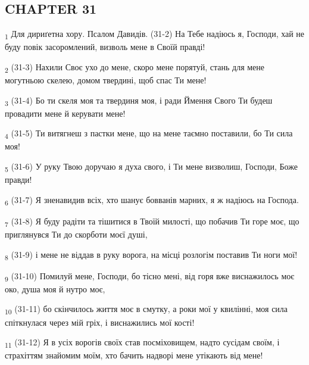 \subsection{CHAPTER 31}
\begin{tcolorbox}
\textsubscript{1} Для дириґетна хору. Псалом Давидів. (31-2) На Тебе надіюсь я, Господи, хай не буду повік засоромлений, визволь мене в Своїй правді!
\end{tcolorbox}
\begin{tcolorbox}
\textsubscript{2} (31-3) Нахили Своє ухо до мене, скоро мене порятуй, стань для мене могутньою скелею, домом твердині, щоб спас Ти мене!
\end{tcolorbox}
\begin{tcolorbox}
\textsubscript{3} (31-4) Бо ти скеля моя та твердиня моя, і ради Ймення Свого Ти будеш провадити мене й керувати мене!
\end{tcolorbox}
\begin{tcolorbox}
\textsubscript{4} (31-5) Ти витягнеш з пастки мене, що на мене таємно поставили, бо Ти сила моя!
\end{tcolorbox}
\begin{tcolorbox}
\textsubscript{5} (31-6) У руку Твою доручаю я духа свого, і Ти мене визволиш, Господи, Боже правди!
\end{tcolorbox}
\begin{tcolorbox}
\textsubscript{6} (31-7) Я зненавидив всіх, хто шанує бовванів марних, я ж надіюсь на Господа.
\end{tcolorbox}
\begin{tcolorbox}
\textsubscript{7} (31-8) Я буду радіти та тішитися в Твоїй милості, що побачив Ти горе моє, що приглянувся Ти до скорботи моєї душі,
\end{tcolorbox}
\begin{tcolorbox}
\textsubscript{8} (31-9) і мене не віддав в руку ворога, на місці розлогім поставив Ти ноги мої!
\end{tcolorbox}
\begin{tcolorbox}
\textsubscript{9} (31-10) Помилуй мене, Господи, бо тісно мені, від горя вже виснажилось моє око, душа моя й нутро моє,
\end{tcolorbox}
\begin{tcolorbox}
\textsubscript{10} (31-11) бо скінчилось життя моє в смутку, а роки мої у квилінні, моя сила спіткнулася через мій гріх, і виснажились мої кості!
\end{tcolorbox}
\begin{tcolorbox}
\textsubscript{11} (31-12) Я в усіх ворогів своїх став посміховищем, надто сусідам своїм, і страхіттям знайомим моїм, хто бачить надворі мене утікають від мене!
\end{tcolorbox}
